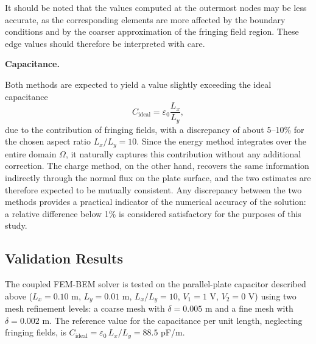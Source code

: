 \documentclass[11pt,onecolumn]{article}
\begin{document}
It should be noted that the values computed at the outermost nodes may be 
less accurate, as the corresponding elements are more affected by the boundary 
conditions and by the coarser approximation of the fringing field region. 
These edge values should therefore be interpreted with care.

\textbf{Capacitance.}
\label{sec:capacitance_remarks}

Both methods are expected to yield a value slightly exceeding the ideal capacitance
\begin{equation}
    C_{\text{ideal}} = \varepsilon_0 \frac{L_x}{L_y},
\end{equation}
due to the contribution of fringing fields, with a discrepancy of about 5--10\% for 
the chosen aspect ratio $L_x/L_y = 10$. Since the energy method integrates over the 
entire domain $\Omega$, it naturally captures this contribution without any additional 
correction. The charge method, on the other hand, recovers the same information 
indirectly through the normal flux on the plate surface, and the two estimates are 
therefore expected to be mutually consistent.
Any discrepancy between the two methods provides a practical indicator of the 
numerical accuracy of the solution: a relative difference below 1\% is considered 
satisfactory for the purposes of this study.

\subsection{Validation Results}

The coupled FEM-BEM solver is tested on the parallel-plate capacitor described above 
($L_x = 0.10$ m, $L_y = 0.01$ m, $L_x/L_y = 10$, $V_1 = 1$ V, $V_2 = 0$ V) using two 
mesh refinement levels: a coarse mesh with $\delta = 0.005$ m and a fine mesh with 
$\delta = 0.002$ m. The reference value for the capacitance per unit length, neglecting 
fringing fields, is $C_{\text{ideal}} = \varepsilon_0\, L_x/L_y = 88.5$ pF/m.
\end{document}
